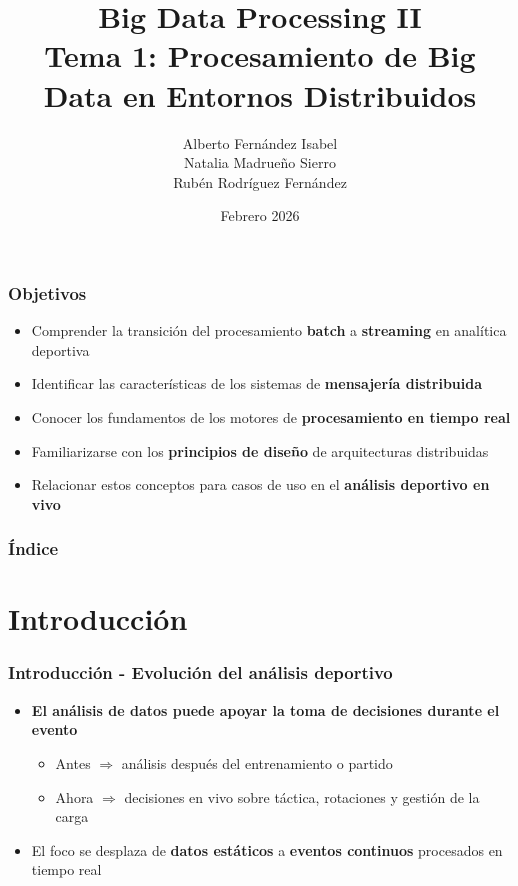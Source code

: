 \documentclass[aspectratio=169]{beamer}
\institute[URJC]{DSLAB}
\author[Big Data Processing II]{
	Alberto Fernández Isabel \\
	Natalia Madrueño Sierro \\
	Rubén Rodríguez Fernández \\
}
\title[Tema 1: Procesamiento en Entornos Distribuidos]{
	Big Data Processing II \\ \vspace{0.2em}
	\large{Tema 1: Procesamiento de Big Data en Entornos Distribuidos}
}
\date{Febrero 2026}
\begin{document}
\begin{frame}
  \titlepage
\end{frame}

\begin{frame}
\frametitle{Objetivos}
	\begin{itemize}
    \item Comprender la transición del procesamiento \textbf{batch} a \textbf{streaming} en analítica deportiva
    \item Identificar las características de los sistemas de \textbf{mensajería distribuida}
    \item Conocer los fundamentos de los motores de \textbf{procesamiento en tiempo real}
    \item Familiarizarse con los \textbf{principios de diseño} de arquitecturas distribuidas
    \item Relacionar estos conceptos para casos de uso en el \textbf{análisis deportivo en vivo}
	\end{itemize}
\end{frame}

\begin{frame}
\frametitle{Índice}
	\tableofcontents
\end{frame}

\section{Introducción}

\begin{frame}\frametitle{Introducción - Evolución del análisis deportivo}
	\begin{itemize}
		\item \textbf{El análisis de datos puede apoyar la toma de decisiones durante el evento}
		\begin{itemize}
			\item Antes $\Rightarrow$ análisis después del entrenamiento o partido
			\item Ahora $\Rightarrow$ decisiones en vivo sobre táctica, rotaciones y gestión de la carga
		\end{itemize}

		\vspace{1em}

		\item El foco se desplaza de \textbf{datos estáticos} a \textbf{eventos continuos} procesados en tiempo real
	\end{itemize}
\end{frame}
\end{document}

